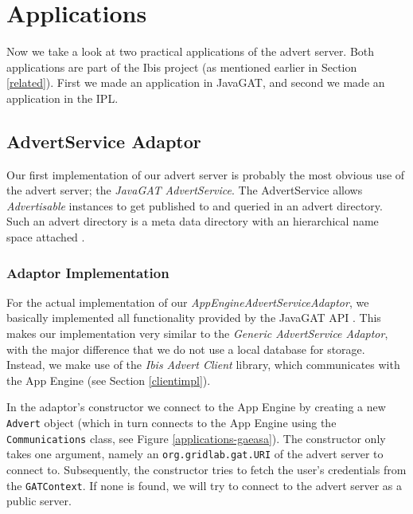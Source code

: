 \section{Applications}
\label{applications}
Now we take a look at two practical applications of the advert server. Both
applications are part of the Ibis project (as mentioned earlier in Section
\ref{related}). First we made an application in JavaGAT, and second we made an
application in the IPL.

\subsection{AdvertService Adaptor}
\label{applications-advertservice}
Our first implementation of our advert server is probably the most obvious use
of the advert server; the \emph{JavaGAT AdvertService}. The AdvertService
allows \emph{Advertisable} instances to get published to and queried in an
advert directory. Such an advert directory is a meta data directory with an
hierarchical name space attached \cite{javagat-javadoc}.

\subsubsection{Adaptor Implementation}
For the actual implementation of our \emph{AppEngineAdvertServiceAdaptor}, we
basically implemented all functionality provided by the JavaGAT API
\cite{javagat-javadoc}. This makes our implementation very similar to the
\emph{Generic AdvertService Adaptor}, with the major difference that we do not
use a local database for storage. Instead, we make use of the \emph{Ibis Advert
Client} library, which communicates with the App Engine (see Section 
\ref{clientimpl}). 

In the adaptor's constructor we connect to the App Engine by creating a new
\texttt{Advert} object (which in turn connects to the App Engine using the
\texttt{Communications} class, see Figure \ref{applications-gaeasa}). The
constructor only takes one argument, namely an \texttt{org.gridlab.gat.URI} of
the advert server to connect to. Subsequently, the constructor tries to fetch the
user's credentials from the \texttt{GATContext}. If none is found, we will try to
connect to the advert server as a public server.

